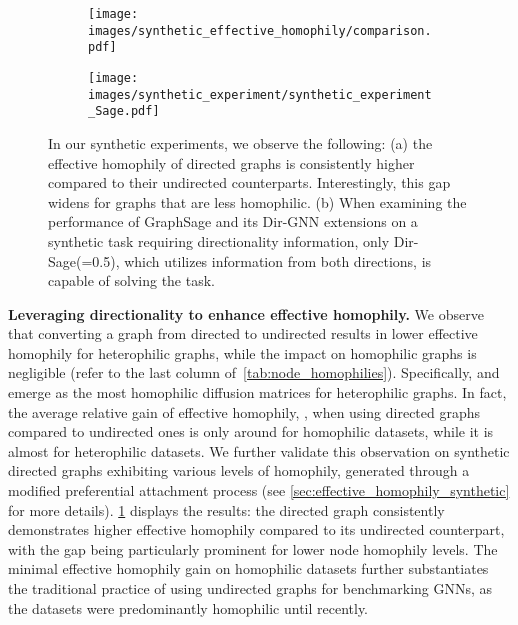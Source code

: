 \documentclass{article}
\newcommand\oursacro{Dir-GNN}
\theoremstyle{plain}
\theoremstyle{definition}
\theoremstyle{remark}
\begin{document}
 
\begin{figure}[t!]
\centering
\vspace{-7mm}
\begin{subfigure}[b]{0.44\textwidth}
     \centering
     \texttt{[image: images/synthetic\_effective\_homophily/comparison.pdf]}
     \caption{}
     \label{fig:synthetic_effective_homophily}
\end{subfigure}
\hspace{5mm}
\begin{subfigure}[b]{0.44\textwidth}
     \centering
     \texttt{[image: images/synthetic\_experiment/synthetic\_experiment\_Sage.pdf]}
     \caption{}
    \label{fig:synthetic_task}
\end{subfigure}

\caption{In our synthetic experiments, we observe the following: (a) the effective homophily of directed graphs is consistently higher compared to their undirected counterparts. Interestingly, this gap widens for graphs that are less homophilic. (b) When examining the performance of GraphSage and its \oursacro{} extensions on a synthetic task requiring directionality information, only Dir-Sage(=0.5), which utilizes information from both directions, is capable of solving the task.}
\label{fig:test1}
\end{figure}

\textbf{Leveraging directionality to enhance effective homophily.}
We observe that converting a graph from directed to undirected results in lower effective homophily for heterophilic graphs, while the impact on homophilic graphs is negligible (refer to the last column of~\cref{tab:node_homophilies}). Specifically,  and  emerge as the most homophilic diffusion matrices for heterophilic graphs. In fact, the average relative gain of effective homophily, , when using directed graphs compared to undirected ones is only around  for homophilic datasets, while it is almost  for heterophilic datasets. We further validate this observation on synthetic directed graphs exhibiting various levels of homophily, generated through a modified preferential attachment process (see \cref{sec:effective_homophily_synthetic} for more details). \cref{fig:synthetic_effective_homophily} displays the results: the directed graph consistently demonstrates higher effective homophily compared to its undirected counterpart, with the gap being particularly prominent for lower node homophily levels. The minimal effective homophily gain on homophilic datasets further substantiates the traditional practice of using undirected graphs for benchmarking GNNs, as the datasets were predominantly homophilic until recently. 
\end{document}

